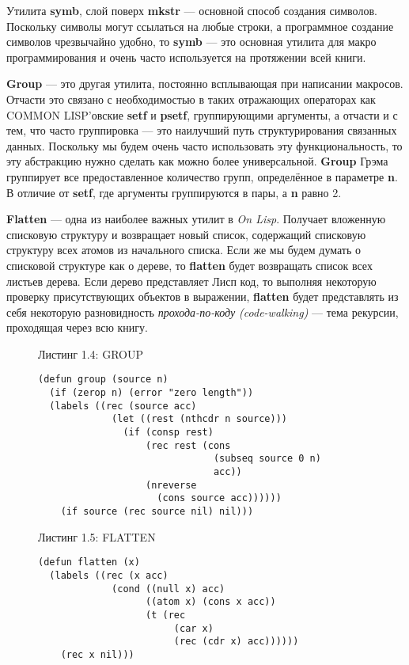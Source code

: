 Утилита \textbf{symb}, слой поверх \textbf{mkstr} --- основной способ создания символов. Поскольку символы могут ссылаться на любые строки, а программное создание символов чрезвычайно удобно, то \textbf{symb} --- это основная утилита для макро программирования и очень часто используется на протяжении всей книги.

\textbf{Group} --- это другая утилита, постоянно всплывающая при написании макросов. Отчасти это связано с необходимостью в таких отражающих операторах как COMMON LISP'овские \textbf{setf} и \textbf{psetf}, группирующими аргументы, а отчасти и с тем, что часто группировка --- это наилучший путь структурирования связанных данных. Поскольку мы будем очень часто использовать эту функциональность, то эту абстракцию нужно сделать как можно более универсальной. \textbf{Group} Грэма группирует все предоставленное количество групп, определённое в параметре \textbf{n}. В отличие от \textbf{setf}, где аргументы группируются в пары, а \textbf{n} равно 2.

\textbf{Flatten} --- одна из наиболее важных утилит в \emph{On Lisp}. Получает вложенную списковую структуру и возвращает новый список, содержащий списковую структуру всех атомов из начального списка. Если же мы будем думать о списковой структуре как о дереве, то \textbf{flatten} будет возвращать список всех листьев дерева. Если дерево представляет Лисп код, то выполняя некоторую проверку присутствующих объектов в выражении, \textbf{flatten} будет представлять из себя некоторую разновидность \emph{прохода-по-коду (code-walking)} --- тема рекурсии, проходящая через всю книгу.

\begin{figure}Листинг 1.4: GROUP\label{listing_1.4}
\listbegin
\begin{verbatim}
(defun group (source n)
  (if (zerop n) (error "zero length"))
  (labels ((rec (source acc)
             (let ((rest (nthcdr n source)))
               (if (consp rest)
                   (rec rest (cons
                               (subseq source 0 n)
                               acc))
                   (nreverse
                     (cons source acc))))))
    (if source (rec source nil) nil)))
\end{verbatim}
\listend
\end{figure}

\begin{figure}Листинг 1.5: FLATTEN\label{listing_1.5}
\listbegin
\begin{verbatim}
(defun flatten (x)
  (labels ((rec (x acc)
             (cond ((null x) acc)
                   ((atom x) (cons x acc))
                   (t (rec
                        (car x)
                        (rec (cdr x) acc))))))
    (rec x nil)))
\end{verbatim}
\listend
\end{figure}

